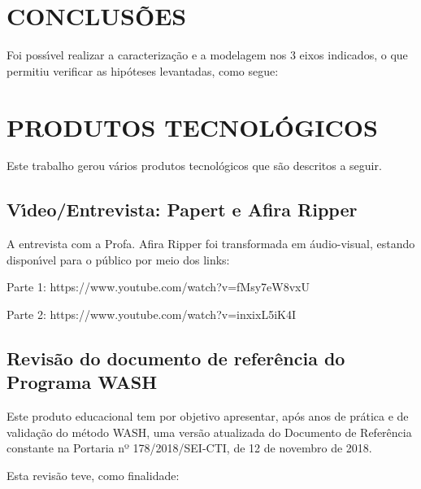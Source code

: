 \documentclass[
12pt,		%
openright,	%
twoside,  %
a4paper,			%
chapter=TITLE,		%
english,			%
french,				%
spanish,			%
brazil				%
]{USPSC-classe/USPSC}
\begin{document}
\chapter[CONCLUS\~OES]{CONCLUS\~OES}\label{CONCLUS\~OES}
Foi poss\'{\i}vel realizar a caracteriza\c{c}\~ao e a modelagem nos 3 eixos indicados, o que permitiu verificar as hip\'oteses levantadas, como segue:




\chapter[PRODUTOS TECNOL\'OGICOS]{PRODUTOS TECNOL\'OGICOS}\label{PRODUTOS TECNOL\'OGICOS}
Este trabalho gerou v\'arios produtos tecnol\'ogicos que s\~ao descritos a seguir.




\section[V\'{\i}deo/Entrevista: Papert e Afira Ripper]{V\'{\i}deo/Entrevista: Papert e Afira Ripper}\label{V\'{\i}deo/Entrevista: Papert e Afira Ripper}
A entrevista com a Profa. Afira Ripper foi transformada em \'audio-visual, estando dispon\'{\i}vel para o p\'ublico por meio dos links:





\begin{alineas}
\item Parte 1: https://www.youtube.com/watch?v=fMsy7eW8vxU
\item Parte 2: https://www.youtube.com/watch?v=inxixL5iK4I
\end{alineas}

\section[Revis\~ao do documento de refer\^encia do Programa WASH]{Revis\~ao do documento de refer\^encia do Programa WASH}\label{Revis\~ao do documento de refer\^encia do Programa WASH}
Este produto educacional tem por objetivo apresentar, ap\'os anos de pr\'atica e de valida\c{c}\~ao do m\'etodo WASH, uma vers\~ao atualizada do Documento de Refer\^encia constante na Portaria nº 178/2018/SEI-CTI, de 12 de novembro de 2018.




Esta revis\~ao teve, como finalidade:
\end{document}

